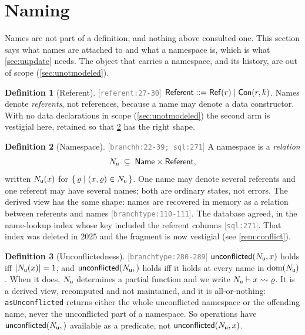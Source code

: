 \documentclass[11pt]{article}
\theoremstyle{definition}
\newtheorem{definition}{Definition}[section]
\theoremstyle{plain}
\theoremstyle{remark}
\newcommand{\src}[1]{{\footnotesize\textcolor{gray}{[\texttt{#1}]}}}
\begin{document}
\section{Naming}\label{sec:unaming}

Names are not part of a definition, and nothing above consulted one. This section says what names are
attached to and what a namespace is, which is what \cref{sec:uupdate} needs. The object that carries a
namespace, and its history, are out of scope (\cref{sec:unotmodeled}).

\begin{definition}[Referent]\label{def:ureferent}
\src{referent:27-30} $\mathsf{Referent} ::= \mathsf{Ref}(r) \mid \mathsf{Con}(r,k)$. Names denote
\emph{referents}, not references, because a name may denote a data constructor. With no data
declarations in scope (\cref{sec:unotmodeled}) the second arm is vestigial here, retained so that
\cref{def:unames} has the right shape.
\end{definition}

\begin{definition}[Namespace]\label{def:unames}
\src{branchh:22-39; sql:271} A namespace is a \emph{relation}
\[
  N_{\mathsf{u}} \;\subseteq\; \mathsf{Name} \times \mathsf{Referent} ,
\]
written $N_{\mathsf{u}}(x)$ for $\{\,\varrho \mid (x,\varrho) \in N_{\mathsf{u}}\,\}$. One name may denote several
referents and one referent may have several names; both are ordinary states, not errors. The derived
view has the same shape: names are recovered in memory as a relation between referents and names
\src{branchtype:110-111}. The database agreed, in the name-lookup index whose key included the
referent columns \src{sql:271}. That index was deleted in 2025 and the fragment is now vestigial (see
\cref{rem:conflict}).
\end{definition}

\begin{definition}[Unconflictedness]\label{def:unconf}
\src{branchtype:280-289} $\mathsf{unconflicted}(N_{\mathsf{u}},x)$ holds iff
$|N_{\mathsf{u}}(x)| = 1$, and $\mathsf{unconflicted}(N_{\mathsf{u}},)$ holds iff it holds at every name in $\operatorname{dom}(N_{\mathsf{u}})$.
When it does, $N_{\mathsf{u}}$ determines a partial function and we write
$N_{\mathsf{u}} \vdash x \rightsquigarrow \varrho$. It is a derived view, recomputed and not maintained, and it is
all-or-nothing: \texttt{asUnconflicted} returns either the whole unconflicted namespace or the
offending name, never the unconflicted part of a namespace. So operations have $\mathsf{unconflicted}(N_{\mathsf{u}},)$
available as a predicate, not $\mathsf{unconflicted}(N_{\mathsf{u}},x)$.
\end{definition}
\end{document}
